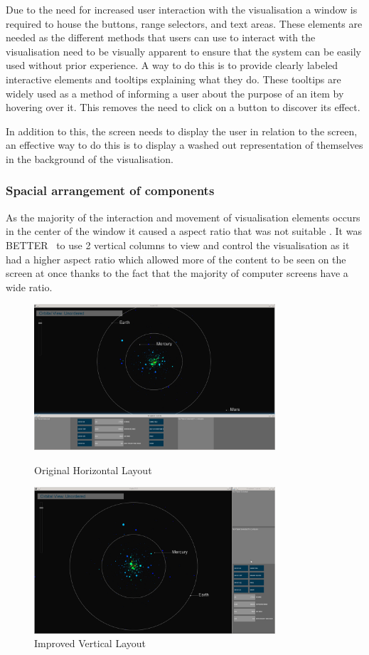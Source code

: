 Due to the need for increased user interaction with the visualisation a window
is required to house the buttons, range selectors, and text areas. These
elements are needed as the different methods that users can use to interact with
the visualisation need to be visually apparent to ensure that the system can be
easily used without prior experience. A way to do this is to provide clearly
labeled interactive elements and tooltips explaining what they
do. These tooltips are widely used as a method of informing a
user about the purpose of an item by hovering over it. This removes the need to
click on a button to discover its effect.


In addition to this, the screen needs to display the user in relation to the
screen, an effective way to do this is to display a washed out representation of
themselves in the background of the visualisation.


\subsubsection{Spacial arrangement of components}
As the majority of the interaction and movement of visualisation elements occurs
in the center of the window it caused a aspect ratio that was not suitable . It
was BETTER~ to use 2 vertical columns to view and control the visualisation as
it had a higher aspect ratio which allowed more of the content to be seen on the
screen at once thanks to the fact that the majority of computer screens have a
wide ratio.

\begin{figure}[H]
  \centering
      \includegraphics[width=0.8\textwidth]{images/layout_horizontal.jpg}
  \caption{Original Horizontal Layout}  
        \includegraphics[width=0.8\textwidth]{images/layout_vertical.jpg}
  \caption{Improved Vertical Layout}
\end{figure}



